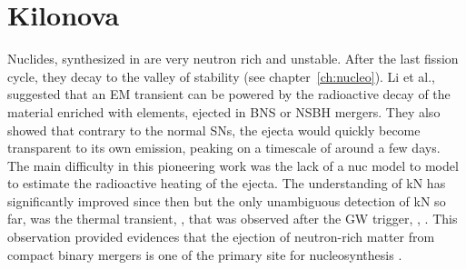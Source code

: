 


\section{Kilonova}

Nuclides, synthesized in \rproc{} are very neutron rich and unstable. After the last 
fission cycle, they decay to the valley of stability (see chapter~\ref{ch:nucleo}). 
%
%
%
Li et al., \citep{Li:1998bw} suggested that an \ac{EM} transient can be powered by the radioactive 
decay of the material enriched with \rproc{} elements, ejected in \ac{BNS} or \ac{NSBH} mergers. 
They also showed that contrary to the normal \acp{SN}, the ejecta would quickly become transparent 
to its own emission, peaking on a timescale of around a few days. The main difficulty in this 
pioneering work was the lack of a \ac{nuc} model to model to estimate the radioactive heating of the 
ejecta. 
%
The understanding of \ac{kN} has significantly improved since then
\citep[\eg][]{Kulkarni:2005jw,Metzger:2010,Roberts:2011,Metzger:2016pju,Wollaeger:2017ahm}
%
but the only unambiguous detection of \ac{kN} so far, was the thermal transient, \AT{}, 
\citep{Coulter:2017wya,Chornock:2017sdf,Nicholl:2017ahq,Cowperthwaite:2017dyu,Tanvir:2017pws,Tanaka:2017qxj}
that was observed after the \ac{GW} trigger, \GW{}, 
\citep{TheLIGOScientific:2017qsa,Abbott:2018wiz,LIGOScientific:2018mvr}.
%
This observation provided evidences that the ejection of neutron-rich matter from compact 
binary mergers is one of the primary site for \rproc{} nucleosynthesis 
\citep{Arcavi:2017xiz,Coulter:2017wya,Drout:2017ijr,Evans:2017mmy,Hallinan:2017woc,Kasliwal:2017ngb,
    Nicholl:2017ahq,Smartt:2017fuw,Soares-santos:2017lru,Tanvir:2017pws,
    Troja:2017nqp,Mooley:2018dlz,Ruan:2017bha,Lyman:2018qjg}. 
